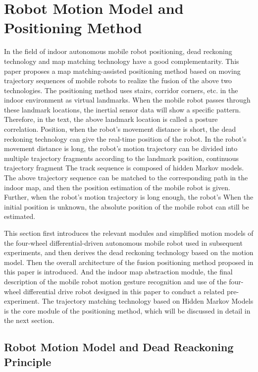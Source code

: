 \documentclass{llncs}
\begin{document}
\section{Robot Motion Model and Positioning Method}

In the field of indoor autonomous mobile robot positioning, dead reckoning technology and map matching technology have a good complementarity. This paper proposes a map matching-assisted positioning method based on moving trajectory sequences of mobile robots to realize the fusion of the above two technologies. The positioning method uses stairs, corridor corners, etc. in the indoor environment as virtual landmarks. When the mobile robot passes through these landmark locations, the inertial sensor data will show a specific pattern. Therefore, in the text, the above landmark location is called a posture correlation. Position, when the robot's movement distance is short, the dead reckoning technology can give the real-time position of the robot. In the robot's movement distance is long, the robot's motion trajectory can be divided into multiple trajectory fragments according to the landmark position, continuous trajectory fragment The track sequence is composed of hidden Markov models. The above trajectory sequence can be matched to the corresponding path in the indoor map, and then the position estimation of the mobile robot is given. Further, when the robot's motion trajectory is long enough, the robot's When the initial position is unknown, the absolute position of the mobile robot can still be estimated.

This section first introduces the relevant modules and simplified motion models of the four-wheel differential-driven autonomous mobile robot used in subsequent experiments, and then derives the dead reckoning technology based on the motion model. Then the overall architecture of the fusion positioning method proposed in this paper is introduced. And the indoor map abstraction module, the final description of the mobile robot motion gesture recognition and use of the four-wheel differential drive robot designed in this paper to conduct a related pre-experiment. The trajectory matching technology based on Hidden Markov Models is the core module of the positioning method, which will be discussed in detail in the next section.

\subsection{Robot Motion Model and Dead Reackoning Principle}
\end{document}

